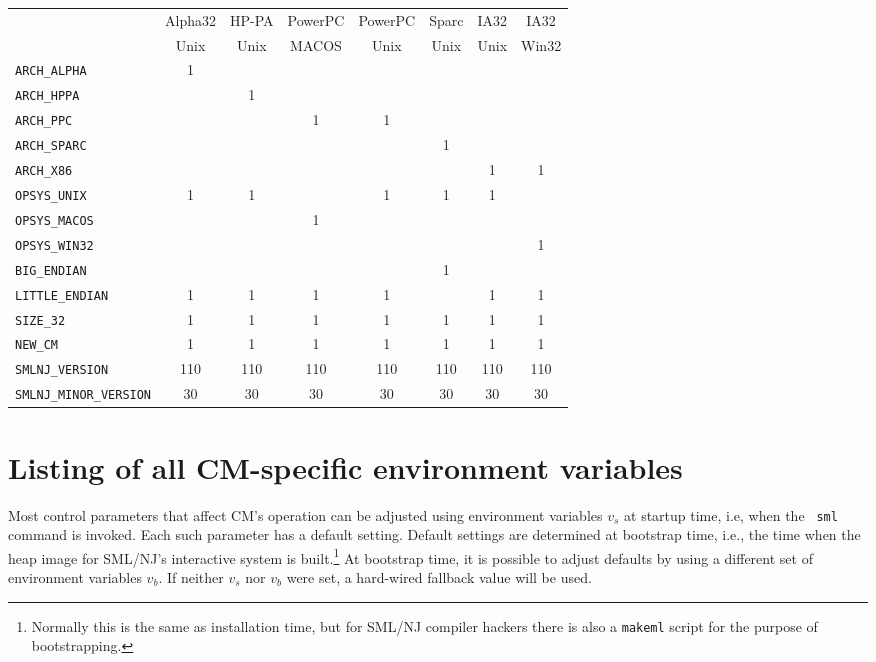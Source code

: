 \documentclass[titlepage,letterpaper]{article}
\newcommand{\smlmj}{110}
\newcommand{\smlmn}{30}
\begin{document}
\begin{center}
\begin{tabular}{l||c|c|c|c|c|c|c}
   & Alpha32 & HP-PA & PowerPC & PowerPC & Sparc & IA32 & IA32 \\
   & Unix & Unix & MACOS & Unix & Unix & Unix & Win32 \\
\hline \hline
{\tt ARCH\_ALPHA}    & 1 & & & & & & \\
{\tt ARCH\_HPPA}     & & 1 & & & & & \\
{\tt ARCH\_PPC}      & & & 1 & 1 & & & \\
{\tt ARCH\_SPARC}    & & & & & 1 & & \\
{\tt ARCH\_X86}      & & & & & & 1 & 1 \\
{\tt OPSYS\_UNIX}    & 1 & 1 & & 1 & 1 & 1 & \\
{\tt OPSYS\_MACOS}   & & & 1 & & & & \\
{\tt OPSYS\_WIN32}   & & & & & & & 1 \\
{\tt BIG\_ENDIAN}    & & & & & 1 & & \\
{\tt LITTLE\_ENDIAN} & 1 & 1 & 1 & 1 & & 1 & 1 \\
{\tt SIZE\_32}       & 1 & 1 & 1 & 1 & 1 & 1 & 1 \\
{\tt NEW\_CM}        & 1 & 1 & 1 & 1 & 1 & 1 & 1 \\
{\tt SMLNJ\_VERSION} & \smlmj & \smlmj & \smlmj & \smlmj & \smlmj & \smlmj & \smlmj \\
{\tt SMLNJ\_MINOR\_VERSION} & \smlmn & \smlmn & \smlmn & \smlmn & \smlmn & \smlmn & \smlmn
\end{tabular}
\end{center}

\section{Listing of all CM-specific environment variables}

Most control parameters that affect CM's operation can be adjusted
using environment variables $v_s$ at startup time, i.e, when the {\tt
sml} command is invoked.  Each such parameter has a default setting.
Default settings are determined at bootstrap time, i.e., the time when
the heap image for SML/NJ's interactive system is
built.\footnote{Normally this is the same as installation time, but
for SML/NJ compiler hackers there is also a {\tt makeml} script for the
purpose of bootstrapping.}  At bootstrap time, it is possible to
adjust defaults by using a different set of environment variables
$v_b$.  If neither $v_s$ nor $v_b$ were set, a hard-wired fallback
value will be used.
\end{document}
